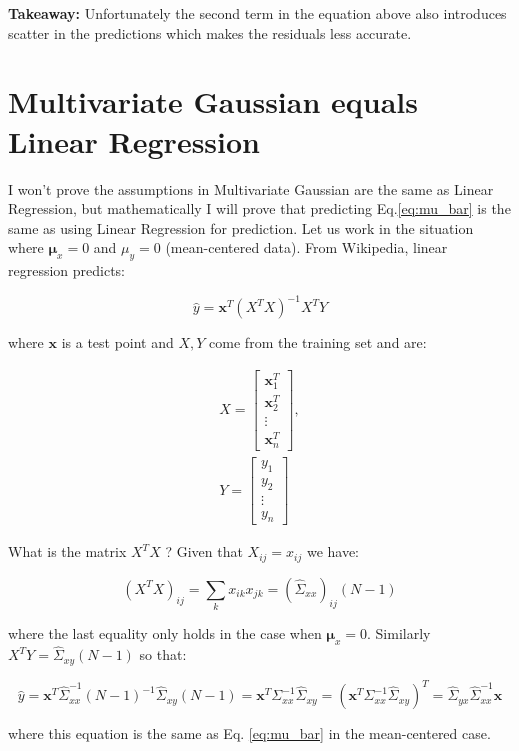 \documentclass[a4paper]{article}
\newcommand{\pth}[1]{\left(#1\right)}
\renewcommand{\vec}[1]{\boldsymbol{#1}}
\newcommand{\xv}[0]{\vec{x}}
\begin{document}
\textbf{Takeaway:} Unfortunately the second term in the equation above also introduces scatter in the predictions which makes the residuals less accurate.

\section{Multivariate Gaussian equals Linear Regression}

I won't prove the assumptions in Multivariate Gaussian are the same as Linear Regression, but mathematically I will prove that predicting Eq.\ref{eq:mu_bar} is the same as using Linear Regression for prediction. Let us work in the situation where $\vec{\mu}_{x} = 0$ and $\mu_{y} = 0$ (mean-centered data). From Wikipedia, linear regression predicts:

\[
	\hat{y} = \vec{x}^{T} \pth{X^{T} X}^{-1} X^{T} Y
\]

where $\xv$ is a test point and $X, Y$ come from the training set and are: 

\begin{align*}
	X = \begin{bmatrix}
			\xv_{1}^{T} \\ 
			\xv_{2}^{T} \\ 
			\vdots \\ 
			\xv_{n}^{T}
		\end{bmatrix}, 	\\
	Y = \begin{bmatrix} 
		y_{1} \\ 
		y_{2} \\ 
		\vdots \\
		y_{n}
	\end{bmatrix}
\end{align*}

What is the matrix $X^{T}X$ ? Given that $X_{ij} = x_{ij}$ we have: 

\[
	\pth{X^{T} X}_{ij} = \sum_{k} x_{ik} x_{jk} = \pth{\hat{\Sigma}_{xx}}_{ij} (N-1)
\]

where the last equality only holds in the case when $\vec{\mu}_{x} = 0$. Similarly $X^{T} Y = \hat{\Sigma}_{xy} (N-1)$ so that: 

\[
	\hat{y} = \xv^{T}  \hat{\Sigma}_{xx}^{-1} (N-1)^{-1} \hat{\Sigma}_{xy} (N-1) = \xv^{T} \Sigma^{-1}_{xx} \hat{\Sigma}_{xy} = \pth{\xv^{T} \Sigma^{-1}_{xx} \hat{\Sigma}_{xy}}^{T} = \hat{\Sigma}_{yx} \hat{\Sigma}_{xx}^{-1} \xv
\]

where this equation is the same as Eq. \ref{eq:mu_bar} in the mean-centered case.
\end{document}

